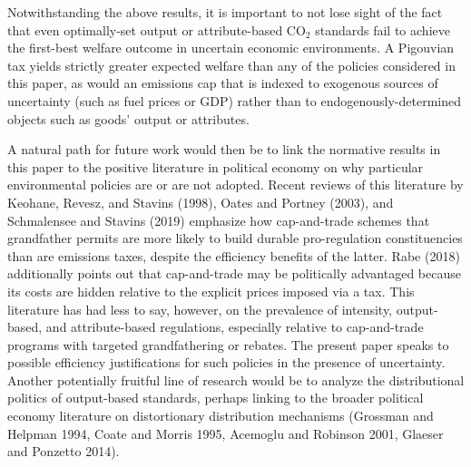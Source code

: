 \documentclass[12pt]{article}
\begin{document}
Notwithstanding the above results, it is important to not lose sight of the fact that even optimally-set output or attribute-based CO$_2$ standards fail to achieve the first-best welfare outcome in uncertain economic environments. A Pigouvian tax yields strictly greater expected welfare than any of the policies considered in this paper, as would an emissions cap that is indexed to exogenous sources of uncertainty (such as fuel prices or GDP) rather than to endogenously-determined objects such as goods' output or attributes.

A natural path for future work would then be to link the normative results in this paper to the positive literature in political economy on why particular environmental policies are or are not adopted. Recent reviews of this literature by Keohane, Revesz, and Stavins (1998), Oates and Portney (2003), and Schmalensee and Stavins (2019) emphasize how cap-and-trade schemes that grandfather permits are more likely to build durable pro-regulation constituencies than are emissions taxes, despite the efficiency benefits of the latter. Rabe (2018) additionally points out that cap-and-trade may be politically advantaged because its costs are hidden relative to the explicit prices imposed via a tax. This literature has had less to say, however, on the prevalence of intensity, output-based, and attribute-based regulations, especially relative to cap-and-trade programs with targeted grandfathering or rebates. The present paper speaks to possible efficiency justifications for such policies in the presence of uncertainty. Another potentially fruitful line of research would be to analyze the distributional politics of output-based standards, perhaps linking to the broader political economy literature on distortionary distribution mechanisms (Grossman and Helpman 1994, Coate and Morris 1995, Acemoglu and Robinson 2001, Glaeser and Ponzetto 2014).
\end{document}
